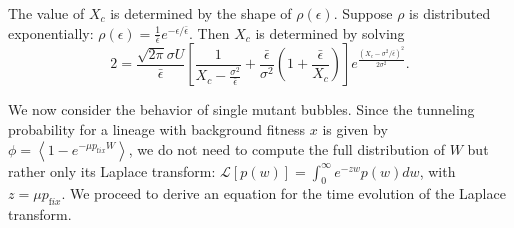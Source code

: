 \documentclass[rmp]{revtex4}
\begin{document}
The value of $X_c$ is determined by the shape of $\rho(\epsilon)$.
Suppose $\rho$ is distributed exponentially: $\rho(\epsilon) = \frac{1}{\bar{\epsilon}} e^{-\epsilon/\bar{\epsilon}}$.
Then $X_c$ is determined by solving
\begin{equation}
2 = \frac{\sqrt{2\pi}\sigma U}{\bar{\epsilon}} \left[ \frac{1}{X_c - \frac{\sigma^2}{\bar{\epsilon}}} + \frac{\bar{\epsilon}}{\sigma^2} \left( 1+ \frac{\bar{\epsilon}}{X_c} \right) \right] e^{\frac{(X_c - \sigma^2/\bar{\epsilon})^2}{2\sigma^2}}. 
\end{equation}

We now consider the behavior of single mutant bubbles.
Since the tunneling probability for a lineage with background fitness $x$ is given by $\phi = \left< 1 - e^{-\mu p_{\mathrm fix} W} \right>$, we do not need to compute the full distribution of $W$ but rather only its Laplace transform: $\mathcal{L}\left[ p(w) \right] = \int_0^\infty e^{-zw} p(w) dw$, with $z = \mu p_{\mathrm fix}$.
We proceed to derive an equation for the time evolution of the Laplace transform.
\end{document}
